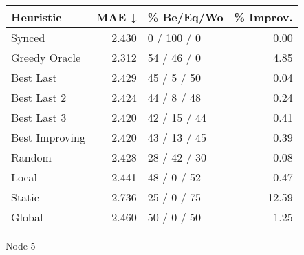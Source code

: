 \begin{tabular}{lrlr}
\toprule
\textbf{Heuristic} & \textbf{MAE ↓} & \textbf{\% Be/Eq/Wo} & \textbf{\% Improv.} \\
\midrule
            Synced &          2.430 &          0 / 100 / 0 &                0.00 \\
     Greedy Oracle &          2.312 &          54 / 46 / 0 &                4.85 \\
         Best Last &          2.429 &          45 / 5 / 50 &                0.04 \\
       Best Last 2 &          2.424 &          44 / 8 / 48 &                0.24 \\
       Best Last 3 &          2.420 &         42 / 15 / 44 &                0.41 \\
    Best Improving &          2.420 &         43 / 13 / 45 &                0.39 \\
            Random &          2.428 &         28 / 42 / 30 &                0.08 \\
             Local &          2.441 &          48 / 0 / 52 &               -0.47 \\
            Static &          2.736 &          25 / 0 / 75 &              -12.59 \\
            Global &          2.460 &          50 / 0 / 50 &               -1.25 \\
\bottomrule
\end{tabular}
\caption{Node 5}
\label{tab:ds_iid_lr05_le2_bs2_5}
